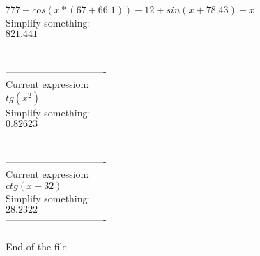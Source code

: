 \documentclass[12pt]{article}
\begin{document}
\( 777+cos(x*(67+66.1))-12+sin(x+78.43)+x\) \\
Simplify something:\\
\( 821.441\) \\
-------------------------------\\
\\
-------------------------------\\
Current expression:\\
\( tg({{x}^{2}})\) \\
Simplify something:\\
\( 0.82623\) \\
-------------------------------\\
\\
-------------------------------\\
Current expression:\\
\( ctg(x+32)\) \\
Simplify something:\\
\( 28.2322\) \\
-------------------------------\\
\\

        End of the file
        
\end{document}
